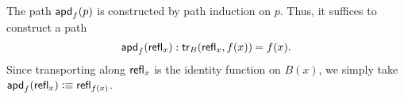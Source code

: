 \begin{constr}
The path $\mathsf{apd}_{f}\mathopen{}\left(p\right)\mathclose{}$ is constructed by path induction on $p$. Thus, it suffices to construct a path
\begin{equation*}
\apd{f}{\refl{x}}:\id{\mathsf{tr}_B(\refl{x},f(x))}{f(x)}.
\end{equation*}
Since transporting along $\mathsf{refl}_{x}$ is the identity function on $B(x)$, we simply take $\mathsf{apd}_{f}\mathopen{}\left(\mathsf{refl}_{x}\right)\mathclose{}\vcentcolon\equiv\mathsf{refl}_{f(x)}$. 
\end{constr}

%

